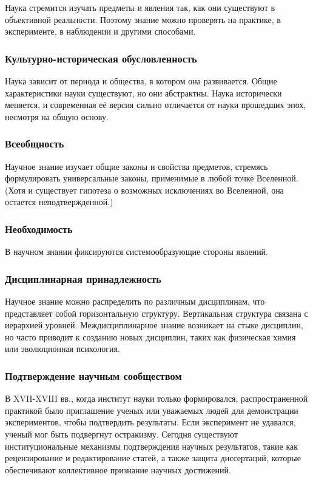 Наука стремится изучать предметы и явления так, как они существуют в объективной
реальности. Поэтому знание можно проверять на практике, в эксперименте, в
наблюдении и другими способами. 

\subsubsection{Культурно-историческая обусловленность}

Наука зависит от периода и общества, в котором она развивается. Общие характеристики науки существуют, но они абстрактны. Наука исторически меняется, и современная её версия сильно отличается от науки прошедших эпох, несмотря на общую основу.

\subsubsection{Всеобщность}

Научное знание изучает общие законы и свойства предметов, стремясь формулировать универсальные законы, применимые в любой точке Вселенной. (Хотя и существует гипотеза о возможных исключениях во Вселенной, она остается неподтвержденной.)

\subsubsection{Необходимость}

В научном знании фиксируются системообразующие стороны явлений. 

\subsubsection{Дисциплинарная принадлежность}

Научное знание можно распределить по различным дисциплинам, что представляет собой горизонтальную структуру. Вертикальная структура связана с иерархией уровней. Междисциплинарное знание возникает на стыке дисциплин, но часто приводит к созданию новых дисциплин, таких как физическая химия или эволюционная психология.

\subsubsection{Подтверждение научным сообществом}

В XVII-XVIII вв., когда институт науки только формировался, распространенной практикой было приглашение ученых или уважаемых людей для демонстрации экспериментов, чтобы подтвердить результаты. Если эксперимент не удавался, ученый мог быть подвергнут остракизму. Сегодня существуют институциональные механизмы подтверждения научных результатов, такие как рецензирование и редактирование статей, а также защита диссертаций, которые обеспечивают коллективное признание научных достижений.

